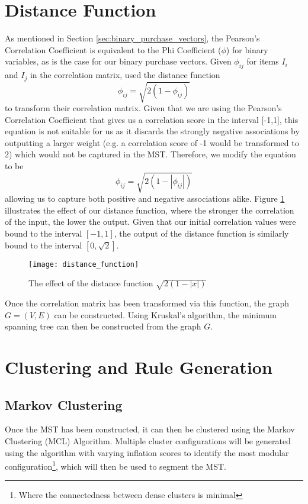 \section{Distance Function}
\label{sec:distance}
As mentioned in Section \ref{sec:binary_purchase_vectors}, the Pearson's Correlation Coefficient is equivalent to the Phi Coefficient ($\phi$) for binary variables, as is the case for our binary purchase vectors. Given $\phi_{ij}$ for items $I_i$ and $I_j$ in the correlation matrix,  used the distance function
\[
\phi_{ij} = \sqrt{2(1-\phi_{ij})}
\]
to transform their correlation matrix. Given that we are using the Pearson's Correlation Coefficient that gives us a correlation score in the interval [-1,1], this equation is not suitable for us as it discards the strongly negative associations by outputting a larger weight (e.g. a correlation score of -1 would be transformed to 2) which would not be captured in the MST. Therefore, we modify the equation to be
\[
\phi_{ij} = \sqrt{2(1-|\phi_{ij}|)}
\]
allowing us to capture both positive and negative associations alike. Figure \ref{fig:distance_function} illustrates the effect of our distance function, where the stronger the correlation of the input, the lower the output. Given that our initial correlation values were bound to the interval $[-1,1]$, the output of the distance function is similarly bound to the interval $[0, \sqrt{2}]$.
\begin{figure}[H]
\centering
\texttt{[image: distance\_function]}
\label{fig:distance_function}
\caption{The effect of the distance function $\sqrt{2(1-|x|)}$}
\end{figure}
\noindent Once the correlation matrix has been transformed via this function, the graph $G=(V,E)$ can be constructed. Using Kruskal's algorithm, the minimum spanning tree can then be constructed from the graph $G$.

\section{Clustering and Rule Generation}
\subsection{Markov Clustering}
Once the MST has been constructed, it can then be clustered using the Markov Clustering (MCL) Algorithm. Multiple cluster configurations will be generated using the algorithm with varying inflation scores to identify the most modular configuration\footnote{Where the connectedness between dense clusters is minimal}, which will then be used to segment the MST.

